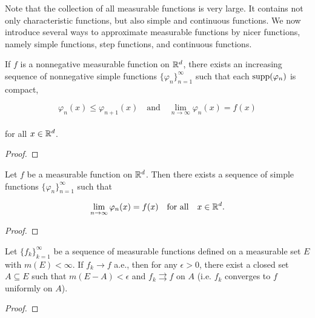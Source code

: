 \documentclass[12pt, a4paper, openany, twoside]{book}
\theoremstyle{definition}
\theoremstyle{remark}
\theoremstyle{plain}
\numberwithin{equation}{section}
\begin{document}
Note that the collection of all measurable functions is very large. It contains not only characteristic functions, but also simple and continuous functions. We now introduce several ways to approximate measurable functions by nicer functions, namely simple functions, step functions, and continuous functions.

\vspace{5mm}
\begin{tcolorbox}[colback=yellow!10!white,colframe=red!75!black,title=Theorem 1.4.7]\label{Theorem 1.4.7}
    If $f$ is a nonnegative measurable function on ${\mathbb {R}}^d$, there exists an increasing sequence of nonnegative simple functions $\{\varphi_n\}_{n=1}^{\infty}$ such that each $\mathrm{supp}(\varphi_n)$ is compact,

    \[\varphi_{n}(x)\leq \varphi_{n+1}(x)\quad\text{and}\quad \lim_{n\rightarrow\infty}{\varphi_n(x)}=f(x)\]
    \\
    for all $x\in{\mathbb {R}}^d$.
\end{tcolorbox}
\begin{proof}
    
\end{proof}
\vspace{5mm}
\begin{tcolorbox}[colback=yellow!10!white,colframe=red!75!black,title=Theorem 1.4.8]\label{Theorem 1.4.8}
    Let $f$ be a measurable function on ${\mathbb {R}}^d$. Then there exists a sequence of simple functions $\{\varphi_n\}_{n=1}^{\infty}$ such that 

    \[\lim_{n\rightarrow\infty}{\varphi_n(x)}=f(x)\quad\text{for all}\quad x\in{\mathbb {R}}^d.\]
\end{tcolorbox}
\begin{proof}
    
\end{proof}
\vspace{5mm}
\begin{tcolorbox}[colback=yellow!10!white,colframe=red!75!black,title=Theorem 1.4.9 (Egorov Theorem)]\label{Theorem 1.4.9}
    Let $\{f_k\}_{k=1}^{\infty}$ be a sequence of measurable functions defined on a measurable set $E$ with $m(E)<\infty$. If $f_k\rightarrow f$ a.e., then for any $\epsilon>0$, there exist a closed set $A\subseteq E$ such that $m(E-A)<\epsilon$ and $f_k\rightrightarrows f$ on $A$ (i.e. $f_k$ converges to $f$ uniformly on $A$).
\end{tcolorbox}
\begin{proof}
    
\end{proof}
\end{document}
